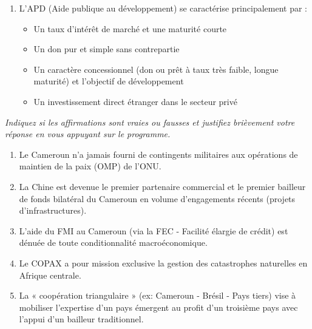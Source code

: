 \documentclass[11pt]{article}
\newcommand{\cle}[1]{{\popxbold\color{popdark}#1}}
\begin{document}
\begin{exercice}
\begin{enumerate}
\begin{itemize}
        \item[D.] Sa position géographique de charnière
    \end{itemize}
    \item L'\cle{APD} (Aide publique au développement) se caractérise principalement par :
    \begin{itemize}
        \item[A.] Un taux d'intérêt de marché et une maturité courte
        \item[B.] Un don pur et simple sans contrepartie
        \item[C.] Un caractère concessionnel (don ou prêt à taux très faible, longue maturité) et l'objectif de développement
        \item[D.] Un investissement direct étranger dans le secteur privé
    \end{itemize}
\end{enumerate}
\end{exercice}

\begin{exercice}
\emph{Indiquez si les affirmations sont vraies ou fausses et justifiez brièvement votre réponse en vous appuyant sur le programme.}
\begin{enumerate}
    \item Le Cameroun n'a jamais fourni de contingents militaires aux opérations de maintien de la paix (OMP) de l'ONU.
    \item La Chine est devenue le premier partenaire commercial et le premier bailleur de fonds bilatéral du Cameroun en volume d'engagements récents (projets d'infrastructures).
    \item L'aide du FMI au Cameroun (via la FEC - Facilité élargie de crédit) est dénuée de toute conditionnalité macroéconomique.
    \item Le \cle{COPAX} a pour mission exclusive la gestion des catastrophes naturelles en Afrique centrale.
    \item La « coopération triangulaire » (ex: Cameroun - Brésil - Pays tiers) vise à mobiliser l'expertise d'un pays émergent au profit d'un troisième pays avec l'appui d'un bailleur traditionnel.
\end{enumerate}
\end{exercice}
\end{document}
